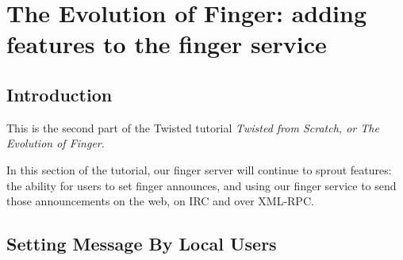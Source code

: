 \section{The Evolution of Finger: adding features to the finger service\label{doc/howto/tutorial/protocol.xhtml}}


\subsection{Introduction}


 This is the second part of the Twisted tutorial \textit{Twisted from Scratch, or The Evolution of Finger}.

In this section of the tutorial, our finger server will continue to sprout features: the ability for users to set finger announces, and using our finger service to send those announcements on the web, on IRC and over XML-RPC.

\subsection{Setting Message By Local Users}


